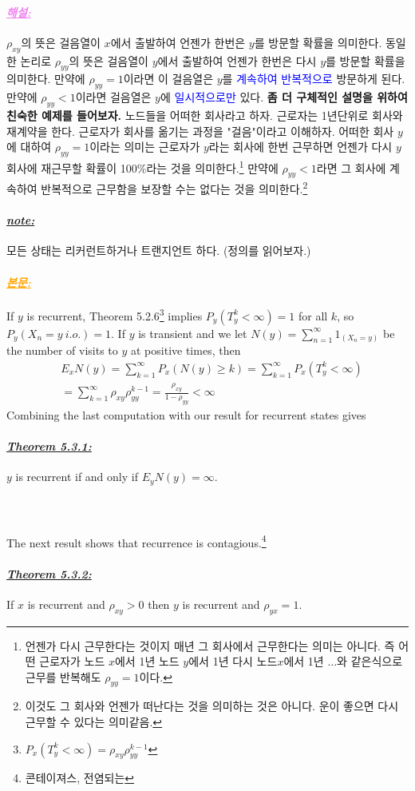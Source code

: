 \documentclass[12pt,oneside,english,a4paper]{article}
\def\bk{\paragraph{\LARGE$$}\LARGE}
\def\note{\paragraph{\LARGE\textit{\underline{note:}}}\LARGE}
\newcommand{\para}[1]{\paragraph{\LARGE\it\underline{\textbf{#1:}}}\LARGE}
\newcommand{\paraviolet}[1]{\paragraph{\LARGE\textcolor{violet}{\it\underline{\textbf{#1:}}}}\LARGE}
\newcommand{\paraorange}[1]{\paragraph{\LARGE\textcolor{orange}{\it\underline{\textbf{#1:}}}}\LARGE}
\begin{document}
\paraviolet{해설} $\rho_{xy}$의 뜻은 걸음열이 $x$에서 출발하여 언젠가 한번은 $y$를 방문할 확률을 의미한다. 동일한 논리로 $\rho_{yy}$의 뜻은 걸음열이 $y$에서 출발하여 언젠가 한번은 다시 $y$를 방문할 확률을 의미한다. 만약에 $\rho_{yy}=1$이라면 이 걸음열은 $y$를 \textcolor{blue}{계속하여 반복적으로} 방문하게 된다. 만약에 $\rho_{yy}<1$이라면 걸음열은 $y$에 \textcolor{blue}{일시적으로만} 있다. {\bf 좀 더 구체적인 설명을 위하여 친숙한 예제를 들어보자.} 노드들을 어떠한 회사라고 하자. 근로자는 1년단위로 회사와 재계약을 한다. 근로자가 회사를 옮기는 과정을 "걸음"이라고 이해하자. 어떠한 회사 $y$에 대하여 $\rho_{yy}=1$이라는 의미는 근로자가 $y$라는 회사에 한번 근무하면 언젠가 다시 $y$회사에 재근무할 확률이 100\%라는 것을 의미한다.\footnote{언젠가 다시 근무한다는 것이지 매년 그 회사에서 근무한다는 의미는 아니다. 즉 어떤 근로자가 노드 $x$에서 1년 노드 $y$에서 1년 다시 노드$x$에서 1년 $\dots$와 같은식으로 근무를 반복해도 $\rho_{yy}=1$이다.} 만약에 $\rho_{yy}<1$라면 그 회사에 계속하여 반복적으로 근무함을 보장할 수는 없다는 것을 의미한다.\footnote{이것도 그 회사와 언젠가 떠난다는 것을 의미하는 것은 아니다. 운이 좋으면 다시 근무할 수 있다는 의미같음.} 

\note 모든 상태는 리커런트하거나 트랜지언트 하다. (정의를 읽어보자.)

\paraorange{본문} If $y$ is recurrent, Theorem 5.2.6\footnote{$P_x(T_y^{k}<\infty)=\rho_{xy}\rho_{yy}^{k-1}$} implies $P_y(T_y^k < \infty) = 1$ for all $k$, so $P_y(X_n = y~ i.o.) = 1$.
If $y$ is transient and we let $N(y)=\sum_{n=1}^{\infty} 1_{(X_n=y)}$ be the number of visits to $y$ at positive times, then 
\begin{align*}
&E_xN(y)=\sum_{k=1}^{\infty}P_x(N(y)\geq k)=\sum_{k=1}^{\infty}P_x(T_y^k<\infty)\\ 
&=\sum_{k=1}^{\infty}\rho_{xy}\rho_{yy}^{k-1}=\frac{\rho_{xy}}{1-\rho_{yy}}<\infty
\end{align*}
Combining the last computation with our result for recurrent states gives
\para{Theorem 5.3.1} $y$ is recurrent if and only if $E_yN(y)=\infty$.

\bk The next result shows that recurrence is contagious.\footnote{콘테이져스, 전염되는}

\para{Theorem 5.3.2} If $x$ is recurrent and $\rho_{xy}>0$ then $y$ is recurrent and $\rho_{yx}=1$. 
\end{document}

